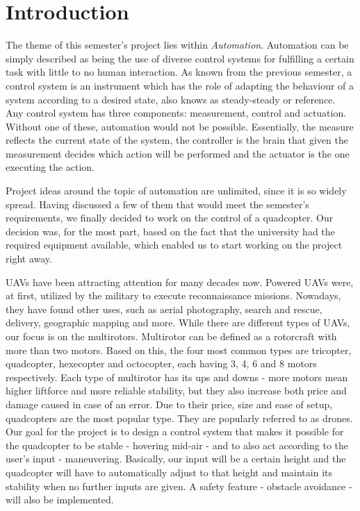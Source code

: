 \section{Introduction}

The theme of this semester's project lies within \textit{Automation}. Automation can be simply described as being the use of diverse control systems for fulfilling a certain task with little to no human interaction. As known from the previous semester, a control system is an instrument which has the role of adapting the behaviour of a system according to a desired state, also knows as steady-steady or reference. Any control system has three components: measurement, control and actuation. Without one of these, automation would not be possible. Essentially, the measure reflects the current state of the system, the controller is the brain that given the measurement decides which action will be performed and the actuator is the one executing the action. 

Project ideas around the topic of automation are unlimited, since it is so widely spread. Having discussed a few of them that would meet the semester's requirements, we finally decided to work on the control of a quadcopter. Our decision was, for the most part, based on the fact that the university had the required equipment available, which enabled us to start working on the project right away. 

UAVs have been attracting attention for many decades now. Powered UAVs were, at first, utilized by the military to execute reconnaissance missions. Nowadays, they have found other uses, such as aerial photography, search and rescue, delivery, geographic mapping and more. While there are different types of UAVs, our focus is on the multirotors. Multirotor can be defined as a rotorcraft with more than two motors. Based on this, the four most common types are tricopter, quadcopter, hexecopter and octocopter, each having 3, 4, 6 and 8 motors respectively. Each type of multirotor has its ups and downs - more motors mean higher liftforce and more reliable stability, but they also increase both price and damage caused in case of an error. Due to their price, size and ease of setup, quadcopters are the most popular type. They are popularly referred to as drones. Our goal for the project is to design a control system that makes it possible for the quadcopter to be stable - hovering mid-air - and to also act according to the user's input - maneuvering. Basically, our input will be a certain height and the quadcopter will have to automatically adjust to that height and maintain its stability when no further inputs are given. A safety feature - obstacle avoidance - will also be implemented. 
